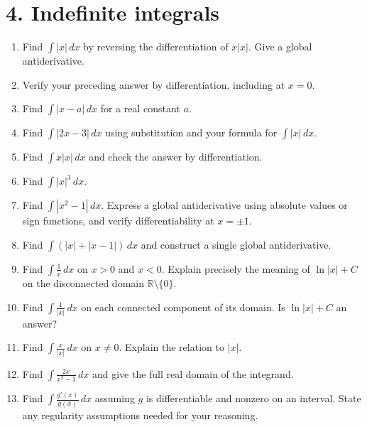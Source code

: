 \documentclass{self-check}
\begin{document}
\section*{4. Indefinite integrals}
\begin{enumerate}[resume]
\item Find $\displaystyle\int |x|\,dx$ by reversing the differentiation of $x|x|$. Give a global antiderivative.
\item Verify your preceding answer by differentiation, including at $x=0$.
\item Find $\displaystyle\int |x-a|\,dx$ for a real constant $a$.
\item Find $\displaystyle\int |2x-3|\,dx$ using substitution and your formula for $\int |x|\,dx$.
\item Find $\displaystyle\int x|x|\,dx$ and check the answer by differentiation.
\item Find $\displaystyle\int |x|^3\,dx$.
\item Find $\displaystyle\int |x^2-1|\,dx$. Express a global antiderivative using absolute values or sign functions, and verify differentiability at $x=\pm1$.
\item Find $\displaystyle\int (|x|+|x-1|)\,dx$ and construct a single global antiderivative.
\item Find $\displaystyle\int\frac{1}{x}\,dx$ on $x>0$ and $x<0$. Explain precisely the meaning of $\ln|x|+C$ on the disconnected domain $\mathbb R\setminus\{0\}$.
\item Find $\displaystyle\int\frac{1}{|x|}\,dx$ on each connected component of its domain. Is $\ln|x|+C$ an answer?
\item Find $\displaystyle\int\frac{x}{|x|}\,dx$ on $x\ne0$. Explain the relation to $|x|$.
\item Find $\displaystyle\int\frac{2x}{x^2-1}\,dx$ and give the full real domain of the integrand.
\item Find $\displaystyle\int\frac{g'(x)}{g(x)}\,dx$ assuming $g$ is differentiable and nonzero on an interval. State any regularity assumptions needed for your reasoning.
\end{enumerate}
\end{document}
